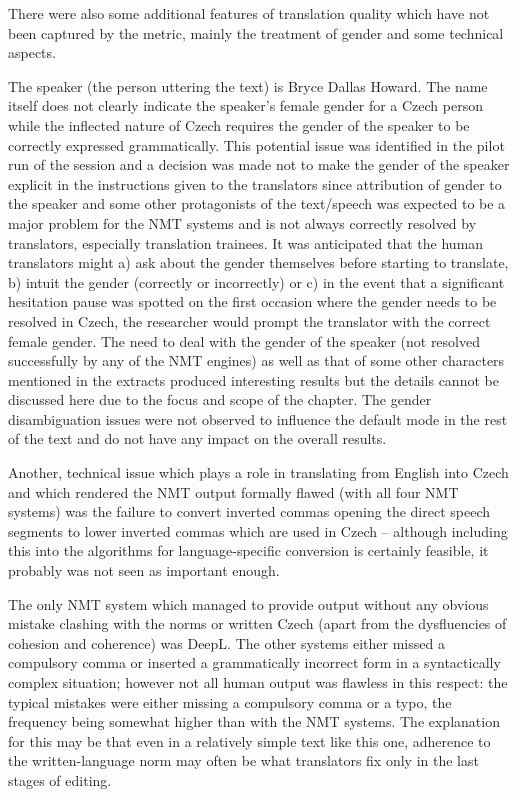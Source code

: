 \documentclass[output=paper]{langscibook}
\begin{document}
There were also some additional features of translation quality which have not been captured by the metric, mainly the treatment of gender and some technical aspects.

The speaker (the person uttering the text) is Bryce Dallas Howard. The name itself does not clearly indicate the speaker’s female gender for a Czech person while the inflected nature of Czech requires the gender of the speaker to be correctly expressed grammatically. This potential issue was identified in the pilot run of the session and a decision was made not to make the gender of the speaker explicit in the instructions given to the translators since attribution of gender to the speaker and some other protagonists of the text/speech was expected to be a major problem for the NMT systems and is not always correctly resolved by translators, especially translation trainees. It was anticipated that the human translators might a) ask about the gender themselves before starting to translate, b) intuit the gender (correctly or incorrectly) or c) in the event that a significant hesitation pause was spotted on the first occasion where the gender needs to be resolved in Czech, the researcher would prompt the translator with the correct female gender. The need to deal with the gender of the speaker (not resolved successfully by any of the NMT engines) as well as that of some other characters mentioned in the extracts produced interesting results but the details cannot be discussed here due to the focus and scope of the chapter. The gender disambiguation issues were not observed to influence the default mode in the rest of the text and do not have any impact on the overall results.

Another, technical issue which plays a role in translating from English into Czech and which rendered the NMT output formally flawed (with all four NMT systems) was the failure to convert inverted commas opening the direct speech segments to lower inverted commas which are used in Czech – although including this into the algorithms for language-specific conversion is certainly feasible, it probably was not seen as important enough.

The only NMT system which managed to provide output without any obvious mistake clashing with the norms or written Czech (apart from the dysfluencies of cohesion and coherence) was DeepL. The other systems either missed a compulsory comma or inserted a grammatically incorrect form in a syntactically complex situation; however not all human output was flawless in this respect: the typical mistakes were either missing a compulsory comma or a typo, the frequency being somewhat higher than with the NMT systems. The explanation for this may be that even in a relatively simple text like this one, adherence to the written-language norm may often be what translators fix only in the last stages of editing.
\end{document}
